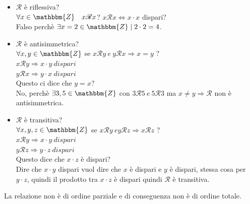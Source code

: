 \documentclass[12pt, letterpaper]{report}
\begin{document}
  		\begin{itemize}
  			\item $\mathscr{R}$ è riflessiva? \\
  			 $\forall x \in \mathbbm{Z} \quad x\mathscr{R}x$? $x\mathscr{R}x \iff x \cdot x$ dispari? \\
  			 Falso perchè $\exists x = 2 \in \mathbbm{Z} \mid 2 \cdot 2 = 4$.
  			 \item $\mathscr{R}$ è antisimmetrica? \\
  			 $\forall x,y \in \mathbbm{Z}$ se $x\mathscr{R}y \ e \ y\mathscr{R}x \Rightarrow x = y$ ? \\
  			 $x\mathscr{R}y \Rightarrow x \cdot y \ dispari$ \\
  			 $y\mathscr{R}x \Rightarrow y \cdot x \ dispari$ \\
  			 Questo ci dice che $y=x$? \\
  			 No, perchè $\exists 3,5 \in \mathbbm{Z}$ con $3\mathscr{R}5 \ e \ 5\mathscr{R}3$ ma $x \neq y \Rightarrow \mathscr{R}$ non è antisimmetrica.
  			 \item $\mathscr{R}$ è transitiva? \\
  			  $\forall x,y,z \in \mathbbm{Z}$ se $x\mathscr{R}y \ e y\mathscr{R}z \Rightarrow x\mathscr{R}z$ ? \\
  			 $x\mathscr{R}y \Rightarrow x \cdot y \ dispari$ \\
  			 $y\mathscr{R}z \Rightarrow y \cdot z \ dispari$ \\
  			 Questo dice che $x \cdot z$ è dispari? \\
  			 Dire che $x \cdot y$ dispari vuol dire che $x$ è dispari e $y$ è dispari, stessa cosa per $y \cdot z$, quindi il prodotto tra $x \cdot z$ è dispari quindi $\mathscr{R}$ è transitiva.
  		\end{itemize}
		La relazione non è di ordine parziale e di conseguenza non è di ordine totale.
\end{document}
